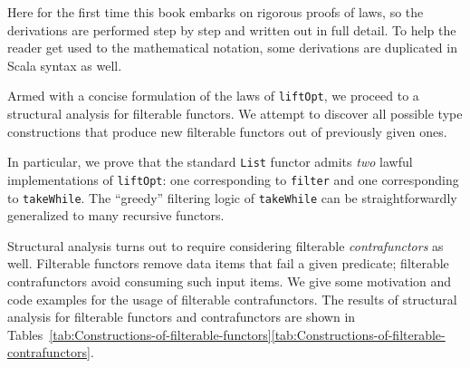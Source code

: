 Here for the first time this book embarks on rigorous proofs of laws,
so the derivations are performed step by step and written out in full
detail. To help the reader get used to the mathematical notation,
some derivations are duplicated in Scala syntax as well.

Armed with a concise formulation of the laws of \lstinline!liftOpt!,
we proceed to a structural analysis for filterable functors. We attempt
to discover all possible type constructions that produce new filterable
functors out of previously given ones.

In particular, we prove that the standard \lstinline!List! functor
admits \emph{two} lawful implementations of \lstinline!liftOpt!:
one corresponding to \lstinline!filter! and one corresponding to
\lstinline!takeWhile!. The \textsf{``}greedy\textsf{''} filtering logic of \lstinline!takeWhile!
can be straightforwardly generalized to many recursive functors.

Structural analysis turns out to require considering filterable \emph{contrafunctors}
as well. Filterable functors remove data items that fail a given predicate;
filterable contrafunctors avoid consuming such input items. We give
some motivation and code examples for the usage of filterable contrafunctors.
The results of structural analysis for filterable functors and contrafunctors
are shown in Tables~\ref{tab:Constructions-of-filterable-functors}\textendash \ref{tab:Constructions-of-filterable-contrafunctors}.

